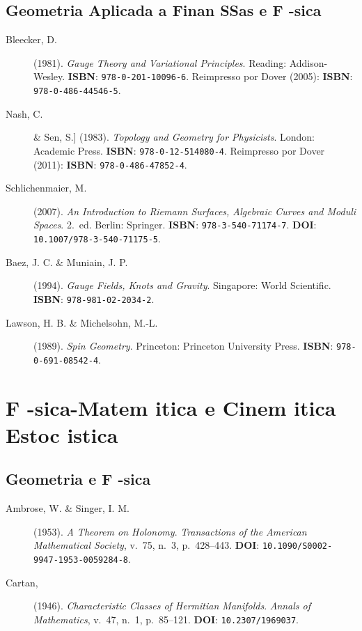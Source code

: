 \subsection{Geometria Aplicada a Finan SSas e F -sica}

\begin{description}
\item[Bleecker, D.] (1981). \textit{Gauge Theory and Variational Principles}. Reading: Addison-Wesley. \textbf{ISBN}: \texttt{978-0-201-10096-6}. Reimpresso por Dover (2005): \textbf{ISBN}: \texttt{978-0-486-44546-5}.

\item[Nash, C.] \& Sen, S.] (1983). \textit{Topology and Geometry for Physicists}. London: Academic Press. \textbf{ISBN}: \texttt{978-0-12-514080-4}. Reimpresso por Dover (2011): \textbf{ISBN}: \texttt{978-0-486-47852-4}.

\item[Schlichenmaier, M.] (2007). \textit{An Introduction to Riemann Surfaces, Algebraic Curves and Moduli Spaces}. 2.~ed. Berlin: Springer. \textbf{ISBN}: \texttt{978-3-540-71174-7}. \textbf{DOI}: \texttt{10.1007/978-3-540-71175-5}.

\item[Baez, J. C. \& Muniain, J. P.] (1994). \textit{Gauge Fields, Knots and Gravity}. Singapore: World Scientific. \textbf{ISBN}: \texttt{978-981-02-2034-2}.

\item[Lawson, H. B. \& Michelsohn, M.-L.] (1989). \textit{Spin Geometry}. Princeton: Princeton University Press. \textbf{ISBN}: \texttt{978-0-691-08542-4}.
\end{description}

\section{F -sica-Matem itica e Cinem itica Estoc istica}
\label{sec:ref_fisica}

\subsection{Geometria e F -sica}

\begin{description}
\item[Ambrose, W. \& Singer, I. M.] (1953). \textit{A Theorem on Holonomy}. \textit{Transactions of the American Mathematical Society}, v.~75, n.~3, p.~428--443. \textbf{DOI}: \texttt{10.1090/S0002-9947-1953-0059284-8}.

\item[Cartan, %

\item[Chern, S. S.] (1946). \textit{Characteristic Classes of Hermitian Manifolds}. \textit{Annals of Mathematics}, v.~47, n.~1, p.~85--121. \textbf{DOI}: \texttt{10.2307/1969037}.
\end{description}

